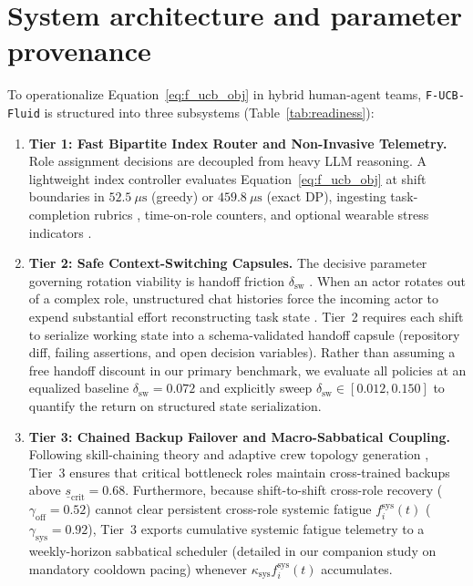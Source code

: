 \documentclass[11pt]{article}
\begin{document}
\section{System architecture and parameter provenance}\label{sec:architecture}

To operationalize Equation~\eqref{eq:f_ucb_obj} in hybrid human-agent teams, \texttt{F-UCB-Fluid} is structured into three subsystems (Table~\ref{tab:readiness}):

\begin{enumerate}
  \item \textbf{Tier 1: Fast Bipartite Index Router and Non-Invasive Telemetry.} Role assignment decisions are decoupled from heavy LLM reasoning. A lightweight index controller evaluates Equation~\eqref{eq:f_ucb_obj} at shift boundaries in $52.5~\mu\mathrm{s}$ (greedy) or $459.8~\mu\mathrm{s}$ (exact DP), ingesting task-completion rubrics \citep{rlvr2_2026}, time-on-role counters, and optional wearable stress indicators \citep{acan2026stress, sathyanarayana2026wearables, jin2025cognitive}.
  \item \textbf{Tier 2: Safe Context-Switching Capsules.} The decisive parameter governing rotation viability is handoff friction $\delta_{\mathrm{sw}}$ \citep{das2026safecontext, rodrigues2026drift}. When an actor rotates out of a complex role, unstructured chat histories force the incoming actor to expend substantial effort reconstructing task state \citep{zhang2025agentprune}. Tier~2 requires each shift to serialize working state into a schema-validated handoff capsule (repository diff, failing assertions, and open decision variables). Rather than assuming a free handoff discount in our primary benchmark, we evaluate all policies at an equalized baseline $\delta_{\mathrm{sw}} = 0.072$ and explicitly sweep $\delta_{\mathrm{sw}} \allowbreak \in [0.012,\allowbreak 0.150]$ to quantify the return on structured state serialization.
  \item \textbf{Tier 3: Chained Backup Failover and Macro-Sabbatical Coupling.} Following skill-chaining theory \citep{hopp2004chaining} and adaptive crew topology generation \citep{li2025argdesigner, chen2026goagent}, Tier~3 ensures that critical bottleneck roles maintain cross-trained backups above $\underline{s}_{\mathrm{crit}} = 0.68$. Furthermore, because shift-to-shift cross-role recovery ($\gamma_{\mathrm{off}} = 0.52$) cannot clear persistent cross-role systemic fatigue $f_i^{\mathrm{sys}}(t)$ ($\gamma_{\mathrm{sys}} = 0.92$), Tier~3 exports cumulative systemic fatigue telemetry to a weekly-horizon sabbatical scheduler (detailed in our companion study on mandatory cooldown pacing) whenever $\kappa_{\mathrm{sys}} f_i^{\mathrm{sys}}(t)$ accumulates.
\end{enumerate}
\end{document}
